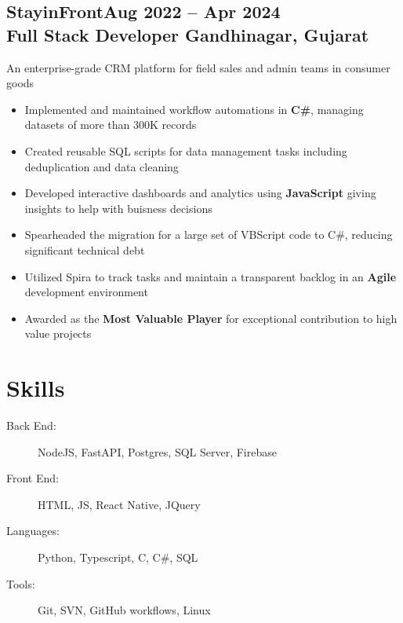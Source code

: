 \documentclass[a4paper]{article}
\newcommand{\experiencetitle}[4]{\subsection{\texorpdfstring{{#1}\hfill\small \textmd{#4} \\
\textmd{#3} \hfill \textmd{#2}}{#1}}}
\begin{document}

\experiencetitle
{StayinFront}{Gandhinagar, Gujarat}
{Full Stack Developer}{Aug 2022 -- Apr 2024}
An enterprise-grade CRM platform for field sales and admin teams in consumer goods
\begin{itemize}
	\item Implemented and maintained workflow automations in \textbf{C\#}, managing datasets of more than 300K records
	\item Created reusable SQL scripts for data management tasks including deduplication and data cleaning
	\item Developed interactive dashboards and analytics using \textbf{JavaScript} giving insights to help with buisness decisions
	\item Spearheaded the migration for a large set of VBScript code to C\#, reducing significant technical debt
	\item Utilized Spira to track tasks and maintain a transparent backlog in an \textbf{Agile} development environment
	\item Awarded as the \textbf{Most Valuable Player} for exceptional contribution to high value projects
\end{itemize}

\section{Skills}

\begin{description}
	\item[Back End:] NodeJS, FastAPI, Postgres, SQL Server, Firebase
	\item[Front End:] HTML, JS, React Native, JQuery
	\item[Languages:] Python, Typescript, C, C\#, SQL
	\item[Tools:] Git, SVN, GitHub workflows, Linux
\end{description}
\end{document}
